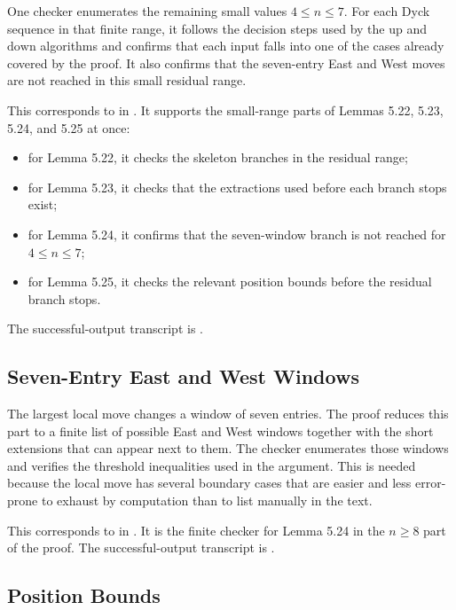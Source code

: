 \documentclass{article}
\begin{document}
One checker enumerates the remaining small values \(4\le n\le 7\). For each
Dyck sequence in that finite range, it follows the decision steps used by the
\(\mathrm{up}\) and \(\mathrm{down}\) algorithms and confirms that each input
falls into one of the cases already covered by the proof. It also confirms that
the seven-entry East and West moves are not reached in this small residual
range.

This corresponds to  in
. It supports the small-range parts of Lemmas 5.22,
5.23, 5.24, and 5.25 at once:
\begin{itemize}
\item for Lemma 5.22, it checks the skeleton branches in the residual range;
\item for Lemma 5.23, it checks that the extractions used before each branch
stops exist;
\item for Lemma 5.24, it confirms that the seven-window branch is not reached
for \(4\le n\le 7\);
\item for Lemma 5.25, it checks the relevant position bounds before the
residual branch stops.
\end{itemize}
The successful-output transcript is
.

\subsection{Seven-Entry East and West Windows}

The largest local move changes a window of seven entries. The proof reduces
this part to a finite list of possible East and West windows together with the
short extensions that can appear next to them. The checker enumerates those
windows and verifies the threshold inequalities used in the argument. This is
needed because the local move has several boundary cases that are easier and
less error-prone to exhaust by computation than to list manually in the text.

This corresponds to  in
. It is the finite checker for Lemma 5.24 in the
\(n\ge 8\) part of the proof. The successful-output transcript is
.

\subsection{Position Bounds}
\end{document}
